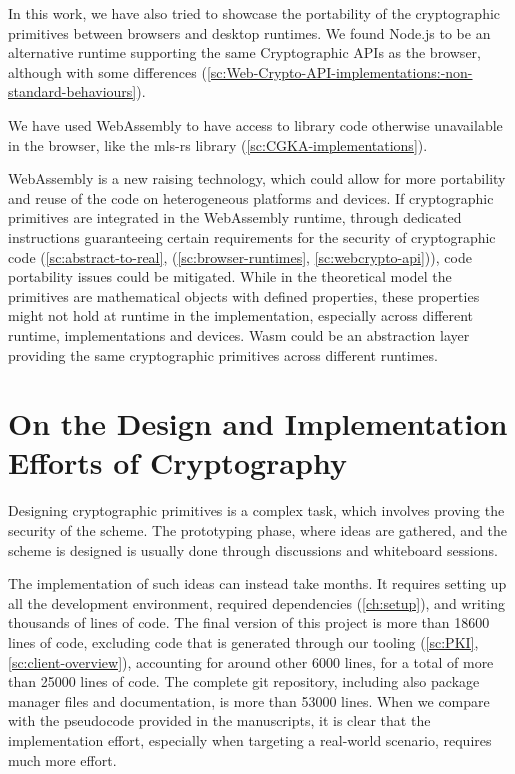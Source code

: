 In this work, we have also tried to showcase the
portability of the cryptographic primitives
between browsers and desktop runtimes.
We found Node.js to be an alternative runtime supporting
the same Cryptographic APIs as the browser, although
with some differences (\cref{sc:Web-Crypto-API-implementations:-non-standard-behaviours}).

We have used WebAssembly to have access to
library code otherwise unavailable
in the browser, like the mls-rs library
(\cref{sc:CGKA-implementations}). 

WebAssembly is a new raising technology, which could
allow for more portability and reuse of the code on
heterogeneous platforms and devices. 
If cryptographic primitives
are integrated in the WebAssembly runtime,
through dedicated instructions guaranteeing
certain requirements for the security of cryptographic
code (\cref{sc:abstract-to-real}, (\cref{sc:browser-runtimes}, \cref{sc:webcrypto-api})),
code portability issues could be mitigated.
While in the theoretical model the primitives are
mathematical objects with defined properties,
these properties might not hold at runtime in the
implementation, especially across different runtime,
implementations and devices.
Wasm could be an abstraction layer providing the
same cryptographic primitives across different
runtimes.

\section{On the Design and Implementation Efforts of Cryptography}\label{sc:gap-crypto-primitives-design-implementation}

Designing cryptographic primitives is a complex task,
which involves proving the security of the scheme. The prototyping phase, where ideas are gathered, 
and the scheme is designed is usually done through 
discussions and whiteboard sessions.

The implementation of such ideas can instead take months.
It requires setting up all the development environment,
required dependencies (\cref{ch:setup}), and writing thousands of lines of code.
The final version of this project 
is more than 18600 lines of code, excluding code that
is generated through our tooling (\cref{sc:PKI}, \cref{sc:client-overview}), 
accounting for around other 6000 lines,
for a total of more than 25000 lines of code.
The complete git repository, including
also package manager files and documentation, 
is more than 53000 lines.
When we compare with the pseudocode provided in the manuscripts,
it is clear that the implementation effort, especially
when targeting a real-world scenario, requires much
more effort. 

